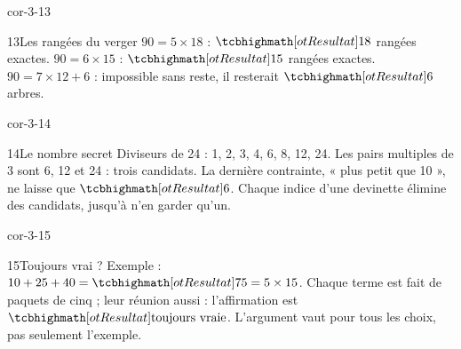\begin{blocLivre}{cor-3-13}\begin{corrige}{13}{Les rangées du verger}
$90=5\times18$ : $\res{18}$ rangées exactes. $90=6\times15$ : $\res{15}$ rangées exactes. $90=7\times12+6$ : impossible sans reste, il resterait $\res6$ arbres.
\end{corrige}\end{blocLivre}
\begin{blocLivre}{cor-3-14}\begin{corrige}{14}{Le nombre secret}
Diviseurs de 24 : 1, 2, 3, 4, 6, 8, 12, 24. Les pairs multiples de 3 sont 6, 12 et 24 : trois candidats. La dernière contrainte, « plus petit que 10 », ne laisse que $\res6$. Chaque indice d’une devinette élimine des candidats, jusqu’à n’en garder qu’un.
\end{corrige}\end{blocLivre}
\begin{blocLivre}{cor-3-15}\begin{corrige}{15}{Toujours vrai ?}
Exemple : $10+25+40=\res{75}=5\times15$. Chaque terme est fait de paquets de cinq ; leur réunion aussi : l’affirmation est $\res{\text{toujours vraie}}$. L’argument vaut pour tous les choix, pas seulement l’exemple.
\end{corrige}\end{blocLivre}
